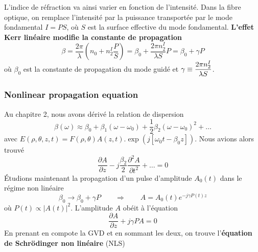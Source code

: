 L'indice de réfraction va ainsi varier en fonction de l'intensité. Dans la fibre optique, on 
remplace l'intensité par la puissance transportée par le mode fondamental $I=PS$, où $S$ est
la surface effective du mode fondamental. \textbf{L'effet Kerr linéaire modifie la constante
de propagation}
\begin{equation}
\beta  = \frac{{2\pi }}{\lambda }({n_0} + n_2^I\frac{P}{S}) = {\beta _0} + \frac{{2\pi n_2^I}}{{\lambda S}}P = {\beta _0} + \gamma P
\end{equation}
où $\beta_0$ est la constante de propagation du mode guidé et $\displaystyle \gamma  \equiv \frac{{2\pi n_2^I}}
{{\lambda S}}$.\\

\subsubsection{Nonlinear propagation equation}
Au chapitre 2, nous avons dérivé la relation de dispersion
\begin{equation}
\beta \left( \omega  \right) \approx {\beta _0} + {\beta _1}\left( {\omega  - {\omega _0}} \right) +
 \frac{1}{2}{\beta _2}{\left( {\omega  - {\omega _0}} \right)^2} + \dots
\end{equation}
avec $E(\rho ,\theta ,z,t) = F(\rho ,\theta )A(z,t).\exp \left( {j[{\omega _0}t - {\beta _0}z]}
 \right)$. Nous avions alors trouvé
 \begin{equation}
\frac{{\partial A}}{{\partial z}} - j\frac{{{\beta _2}}}{2}\frac{{{\partial ^2}A}}{{\partial {t^2}}} + \dots = 0
 \end{equation}
Étudions maintenant la propagation d'un pulse d'amplitude $A_0(t)$ dans le régime non linéaire
\begin{equation}
{\beta _0} \to {\beta _0} + \gamma P\qquad\Rightarrow\qquad A = {A_0}(t){e^{ - j\gamma P(t)z}}
\end{equation}
où $P(t)\propto |A(t)|^2$. L'amplitude $A$ obéit à l'équation
\begin{equation}
\frac{{\partial A}}{{\partial z}} + j\gamma PA = 0
\end{equation}
En prenant en compote la GVD et en sommant les deux, on trouve l'\textbf{équation de Schrödinger
non linéaire} (NLS)\\

\ \\

